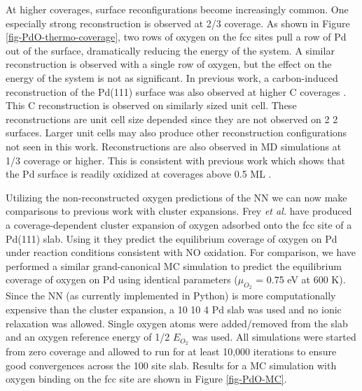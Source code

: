 \documentclass[12pt]{cmuthesis}
\begin{document}
At higher coverages, surface reconfigurations become increasingly common. One especially strong reconstruction is observed at 2/3 coverage. As shown in Figure \ref{fig-PdO-thermo-coverage}, two rows of oxygen on the fcc sites pull a row of Pd out of the surface, dramatically reducing the energy of the system. A similar reconstruction is observed with a single row of oxygen, but the effect on the energy of the system is not as significant. In previous work, a carbon-induced reconstruction of the Pd(111) surface was also observed at higher C coverages \cite{kitchin-2009-correl-cover}. This C reconstruction is observed on similarly sized unit cell. These reconstructions are unit cell size depended since they are not observed on 2 \texttimes{} 2 surfaces. Larger unit cells may also produce other reconstruction configurations not seen in this work. Reconstructions are also observed in MD simulations at 1/3 coverage or higher. This is consistent with previous work which shows that the Pd surface is readily oxidized at coverages above 0.5 ML \cite{lundgren-2002-two-dimen,todorova-2004-oxygen-overl}.

Utilizing the non-reconstructed oxygen predictions of the NN we can now make comparisons to previous work with cluster expansions. Frey \emph{et al.}  have produced a coverage-dependent cluster expansion of oxygen adsorbed onto the fcc site of a Pd(111) slab. Using it they predict the equilibrium coverage of oxygen on Pd under reaction conditions consistent with NO oxidation. For comparison, we have performed a similar grand-canonical MC simulation to predict the equilibrium coverage of oxygen on Pd using identical
parameters (\(\mu_{O_{2}}\) = 0.75 eV at 600 K). Since the NN (as currently implemented in Python) is more computationally expensive than the cluster expansion, a 10 \texttimes{} 10 \texttimes{} 4 Pd slab was used and no ionic relaxation was allowed. Single oxygen atoms were added/removed from the slab and an oxygen reference energy of 1/2 \(E_{O_{2}}\) was used. All simulations were started from zero coverage and allowed to run for at least 10,000 iterations to ensure good convergences across the 100 site slab. Results for a MC simulation with oxygen binding on the fcc site are shown in Figure \ref{fig-PdO-MC}.
\end{document}
